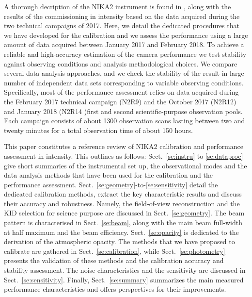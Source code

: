 A thorough decription of the NIKA2 instrument is found in \citet{Adam2017},
along with the results of the commissioning in intensity based on the
data acquired during the two technical campaigns of 2017. Here, we
detail the dedicated procedures that we have developed for the
calibration and we assess the performance using a large amount of
data acquired between January 2017 and February 2018.
To achieve a reliable and high-accuracy estimation
of the camera performance we test stability
against observing conditions and analysis
 methodological choices. We compare several data analysis approaches,
and we check the stability of the result in large number of
independent data sets corresponding to variable observing conditions.
Specifically, most of the performance assessment relies on data
acquired during the February 2017 technical campaign (N2R9) and the
October 2017 (N2R12) and January 2018 (N2R14 )first and second
scientific-purpose observation pools. Each campaign consists of about
1300 observation scans lasting between two and twenty minutes for a
total observation time of about 150 hours.

This paper constitutes a reference review of NIKA2 calibration and
performance assessment in intensity. This outlines as follows:
Sect.~\ref{se:instru}-to-\ref{se:dataproc} give short summaries of the
instrumental set up, the observational modes and the data analysis methods
that have been used for the calibration and the performance
assessment. Sect.~\ref{se:geometry}-to-\ref{se:sensitivity} detail the
dedicated calibration methods, extract the key characteristic results
and discuss their accuracy and robustness. Namely, the field-of-view
reconstruction and the KID selection for science purpose are discussed
in Sect.~\ref{se:geometry}. The beam pattern is characterised in
Sect.~\ref{se:beam}, along with the main beam
full-width at half maximum and the beam
efficiency. Sect.~\ref{se:opacity} is dedicated to the derivation of
the atmospheric opacity. The methods that we have proposed to
calibrate are gathered in Sect.~\ref{se:calibration}, while
Sect.~\ref{se:photometry} presents the validation of these methods and
the calibration accuracy and stability assessment. The noise
characteristics and the sensitivity are discussed in
Sect.~\ref{se:sensitivity}. Finally, Sect.~\ref{se:summary} summarizes
the main measured performance characteristics and offers perspectives
for their improvements. 















